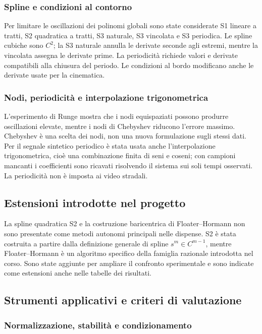 \documentclass[11pt,a4paper]{article}
\numberwithin{equation}{section}
\begin{document}
\subsubsection{Spline e condizioni al contorno}

Per limitare le oscillazioni dei polinomi globali sono state considerate
S1 lineare a tratti, S2 quadratica a tratti, S3 naturale, S3 vincolata e
S3 periodica. Le spline cubiche sono $C^2$; la S3 naturale annulla le
derivate seconde agli estremi, mentre la vincolata assegna le derivate
prime. La periodicità richiede valori e derivate compatibili alla chiusura
del periodo. Le condizioni al bordo modificano anche le derivate usate
per la cinematica.

\subsubsection{Nodi, periodicità e interpolazione trigonometrica}

L'esperimento di Runge mostra che i nodi equispaziati possono produrre
oscillazioni elevate, mentre i nodi di Chebyshev riducono l'errore
massimo. Chebyshev è una scelta dei nodi, non una nuova formulazione sugli
stessi dati. Per il segnale sintetico periodico è stata usata anche
l'interpolazione trigonometrica, cioè una combinazione finita di seni e
coseni; con campioni mancanti i coefficienti sono ricavati risolvendo il
sistema sui soli tempi osservati. La periodicità non è imposta ai video
stradali.

\subsection{Estensioni introdotte nel progetto}

La spline quadratica S2 e la costruzione baricentrica di Floater--Hormann
non sono presentate come metodi autonomi principali nelle dispense. S2 è
stata costruita a partire dalla definizione generale di spline
$s^m\in C^{m-1}$, mentre Floater--Hormann è un algoritmo specifico della
famiglia razionale introdotta nel corso. Sono state aggiunte per ampliare
il confronto sperimentale e sono indicate come estensioni anche nelle
tabelle dei risultati.

\subsection{Strumenti applicativi e criteri di valutazione}

\subsubsection{Normalizzazione, stabilità e condizionamento}
\end{document}

